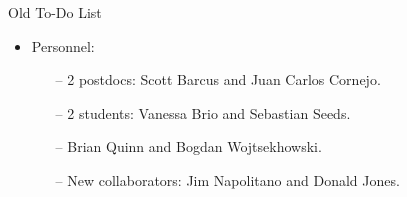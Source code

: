 \documentclass[10pt]{beamer}
\begin{document}
\begin{frame}{Old To-Do List}
	\begin{itemize}
		\item \alert{Personnel:}
			\begin{itemize}
				\item[--] 2 postdocs: \alert{Scott Barcus} and \alert{Juan Carlos Cornejo}.
				\item[--] 2 students: \alert{Vanessa Brio} and \alert{Sebastian Seeds}.
				\item[--] \alert{Brian Quinn} and \alert{Bogdan Wojtsekhowski}.
				\item[--] New collaborators: \alert{Jim Napolitano} and \alert{Donald Jones}.
			\end{itemize}
	\end{itemize}

\end{frame}
\end{document}
